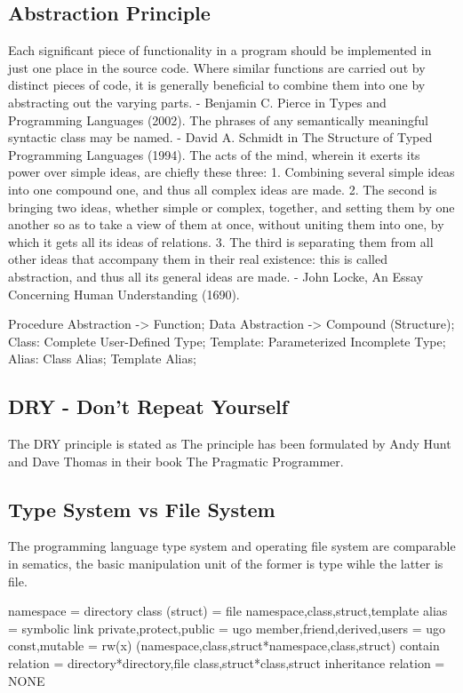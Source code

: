 \subsection*{Abstraction Principle}
Each significant piece of functionality in a program should be implemented
in just one place in the source code. Where similar functions are carried out
by distinct pieces of code, it is generally beneficial to combine them
into one by abstracting out the varying parts.
- Benjamin C. Pierce in Types and Programming Languages (2002).
The phrases of any semantically meaningful syntactic class may be named.
- David A. Schmidt in The Structure of Typed Programming Languages (1994).
The acts of the mind, wherein it exerts its power over simple ideas,
are chiefly these three: 1. Combining several simple ideas into one
compound one, and thus all complex ideas are made. 2. The second
is bringing two ideas, whether simple or complex, together, and
setting them by one another so as to take a view of them at once,
without uniting them into one, by which it gets all its ideas of
relations. 3. The third is separating them from all other ideas that
accompany them in their real existence: this is called abstraction, and
thus all its general ideas are made.
- John Locke, An Essay Concerning Human Understanding (1690).
\begin{code}
Procedure Abstraction -> Function;
Data Abstraction -> Compound (Structure);
Class: Complete User-Defined Type;
Template: Parameterized Incomplete Type;
Alias: Class Alias; Template Alias;
\end{code}

\subsection*{DRY - Don't Repeat Yourself}
The DRY principle is stated as 
The principle has been formulated by Andy Hunt and Dave Thomas
in their book The Pragmatic Programmer.

\subsection*{Type System vs File System}
The  programming language type system and operating file system
are comparable in sematics, the basic manipulation unit of
the former is type wihle the latter is file.
\begin{code}
namespace = directory
class (struct) = file
{namespace,class,struct,template} alias = symbolic link
{private,protect,public} = ugo
{member,friend,derived,users} = ugo
{const,mutable} = rw(x)
({namespace,class,struct}*{namespace,class,struct}) contain relation = {directory}*{directory,file}
{class,struct}*{class,struct} inheritance relation = NONE
\end{code}

